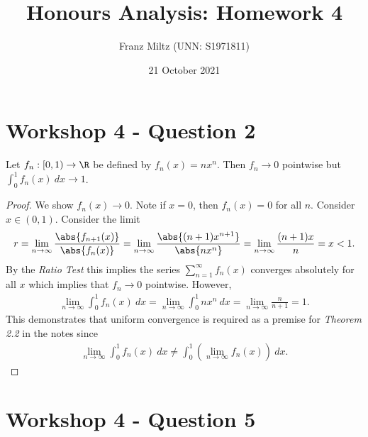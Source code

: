 \documentclass{article}
\begin{document}
\title{Honours Analysis: Homework 4}
\author{Franz Miltz (UNN: S1971811)}
\date{21 October 2021}
\maketitle

\section*{Workshop 4 - Question 2}

\begin{claim*}
   Let $f_n:\left[0,1\right)\to\R$ be defined by $f_n(x)=nx^n$.
   Then $f_n\to 0$ pointwise but $\int_0^1 f_n(x)\:dx\to 1$.
\end{claim*}

\begin{proof}
   We show $f_n(x)\to 0$.
   Note if $x=0$, then $f_n(x)=0$ for all $n$. Consider $x\in(0,1)$.
   Consider the limit
   \begin{align*}
      r = \lim_{n\to\infty} \frac{\abs{f_{n+1}(x)}}{\abs{f_n(x)}}
      = \lim_{n\to\infty}\frac{\abs{(n+1)x^{n+1}}}{\abs{nx^n}}
      = \lim_{n\to\infty}\frac{(n+1)x}{n} = x < 1.
   \end{align*}
   By the \emph{Ratio Test} this implies the series $\sum_{n=1}^\infty
      f_n(x)$ converges absolutely for all $x$ which implies that
   $f_n\to 0$ pointwise. However,
   \begin{align*}
      \lim_{n\to\infty} \int_0^1 f_n(x)\:dx
      = \lim_{n\to\infty}\int_0^1 nx^n\:dx
      = \lim_{n\to\infty}\frac{n}{n+1} = 1.
   \end{align*}
   This demonstrates that uniform convergence is required as a premise for
   \emph{Theorem 2.2} in the notes since
   \begin{align*}
      \lim_{n\to\infty} \int_0^1 f_n(x)\:dx
      \not = \int_0^1\left(\lim_{n\to\infty} f_n(x)\right)\:dx.
   \end{align*}
\end{proof}

\section*{Workshop 4 - Question 5}
\end{document}
